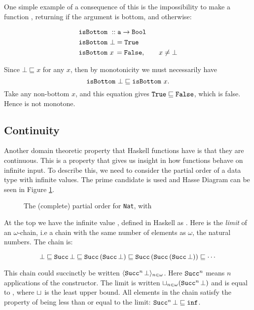 One simple example of a consequence of this is the impossibility to
make a function , returning  if the
argument is bottom, and  otherwise:

\begin{align*}
& \hs{isBottom} \w :: \hs{a} \rightarrow \hs{Bool} \\
& \hs{isBottom} \w \bot = \hs{True} \\
& \hs{isBottom} \w x \, = \hs{False}, \qquad x \neq \bot
\end{align*}

\noindent
Since $\bot \sqsubseteq x$ for any $x$, then by monotonicity we must
necessarily have
$$\hs{isBottom} \w \bot \sqsubseteq \hs{isBottom} \w x.$$
Take any non-bottom $x$, and this equation gives
$\hs{True} \sqsubseteq \hs{False}$, which is false. Hence
 is not monotone.

\subsection{Continuity}
Another domain theoretic property that Haskell functions have is that
they are continuous. This is a property that gives us insight in how
functions behave on infinite input.  To describe this, we need to
consider the partial order of a data type with infinite values. The
prime candidate  is used and Hasse
Diagram can be seen in Figure \ref{fig:natcpo}.

\begin{figure}[h]
\centering

\caption{
    The (complete) partial order for \texttt{Nat}, with 
    \label{fig:natcpo}
}
\end{figure}

At the top we have the infinite value , defined in Haskell as
. Here  is the \emph{limit} of an
$\omega$-chain, i.e a chain with the same number of elements as
$\omega$, the natural numbers. The chain is:

\begin{equation*}
\bot \sqsubseteq
\hs{Succ} \, \bot \sqsubseteq
\hs{Succ} \, (\hs{Succ} \, \bot) \sqsubseteq
\hs{Succ} \, (\hs{Succ} \, (\hs{Succ} \, \bot)) \sqsubseteq
\cdots
\end{equation*}

This chain could succinctly be written $\langle \hs{Succ}^n \, \bot
\rangle_{n \in \omega}$.  Here $\hs{Succ}^n$ means $n$ applications of
the  constructor. The limit is written $\lub{n \in
  \omega}(\hs{Succ}^n \, \bot)$ and is equal to , where
$\sqcup_{}$ is the least upper bound. All elements in the chain satisfy
the property of being less than or equal to the limit: $\hs{Succ}^n \,
\bot \sqsubseteq \hs{inf}$.

